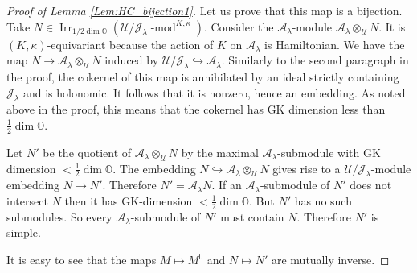 \documentclass[12pt]{amsart}
\newcommand{\A}{\mathcal{A}}
\newcommand{\U}{\mathcal{U}}
\newcommand{\J}{\mathcal{J}}
\newcommand{\Orb}{\mathbb{O}}
\newcommand{\Hom}{\operatorname{Hom}}
\theoremstyle{definition}
\numberwithin{equation}{section}
\begin{document}
\begin{proof}[Proof of Lemma \ref{Lem:HC_bijection1}]
Let us prove that this map is a bijection. Take $N\in \operatorname{Irr}_{1/2\dim \Orb}(\U/\J_\lambda\operatorname{-mod}^{K,\kappa})$.
Consider the $\A_\lambda$-module $\A_\lambda\otimes_\U N$.
It is $(K,\kappa)$-equivariant because the action of $K$ on $\A_\lambda$ is Hamiltonian.
We have the map
$N\rightarrow \A_\lambda\otimes_\U N$ induced by $\U/\J_\lambda\hookrightarrow \A_\lambda$.
Similarly to the second paragraph in the proof, the cokernel of this map is annihilated by an ideal strictly containing $\J_\lambda$
and is holonomic. It follows that it is nonzero, hence an embedding. As noted above in the proof, this means that the cokernel has GK
dimension less than $\frac{1}{2}\dim \Orb$.


Let $N'$ be the quotient of $\A_\lambda\otimes_\U N$
by the maximal $\A_\lambda$-submodule with GK dimension $<\frac{1}{2}\dim \Orb$.
The embedding $N\hookrightarrow \A_\lambda\otimes_\U N$ gives rise
to a $\U/\J_\lambda$-module embedding $N\rightarrow N'$.
Therefore $N'=\A_\lambda N$. If an $\A_\lambda$-submodule of $N'$ does not intersect $N$ then it has
GK-dimension $<\frac{1}{2}\dim \Orb$. But $N'$ has no such submodules. So
every $\A_\lambda$-submodule of $N'$ must contain $N$. Therefore $N'$ is simple.

It is easy to see that the maps $M\mapsto M^0$ and $N\mapsto N'$ are mutually inverse.
\end{proof}
\end{document}
